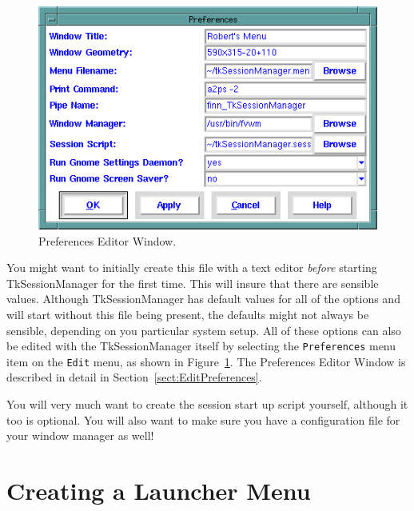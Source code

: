 \begin{figure}[hbpt]
\begin{centering}
\includegraphics[width=5in]{PreferencesEditor.png}
\caption{Preferences Editor Window.}
\label{tut:fig:preferenceseditor}
\end{centering}
\end{figure}
You might want to initially create this file with a text editor
\textit{before} starting TkSessionManager for the first time.  This will
insure that there are sensible values.  Although TkSessionManager has
default values for all of the options and will start without this file
being present, the defaults might not always be sensible, depending on
you particular system setup.  All of these options can also be edited
with the TkSessionManager itself by selecting the \texttt{Preferences}
menu item on the \texttt{Edit} menu, as shown in
Figure~\ref{tut:fig:preferenceseditor}. The Preferences Editor Window is
described in detail in Section~\ref{sect:EditPreferences}.

You will very much want to create the session start up script yourself,
although it too is optional.  You will also want to make sure you have a
configuration file for your window manager as well!

\section{Creating a Launcher Menu}

